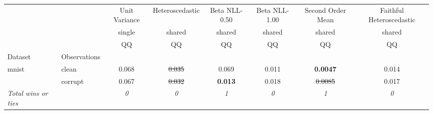 \begin{tabular}{ll|c|c|c|c|c|c}
\toprule
{} & {} & {Unit Variance} & {Heteroscedastic} & {Beta NLL-0.50} & {Beta NLL-1.00} & {Second Order Mean} & {Faithful Heteroscedastic} \\
{} & {} & {single} & {shared} & {shared} & {shared} & {shared} & {shared} \\
{} & {} & {QQ} & {QQ} & {QQ} & {QQ} & {QQ} & {QQ} \\
{Dataset} & {Observations} & {} & {} & {} & {} & {} & {} \\
\midrule
\multirow[t]{2}{*}{mnist} & clean & 0.068 & \sout{0.035} & 0.069 & 0.011 & \textbf{0.0047} & 0.014 \\
 & corrupt & 0.067 & \sout{0.032} & \textbf{0.013} & 0.018 & \sout{0.0085} & 0.017 \\
\textit{{Total wins or ties}} &  & \textit{0} & \textit{0} & \textit{1} & \textit{0} & \textit{1} & \textit{0} \\
\bottomrule
\end{tabular}
